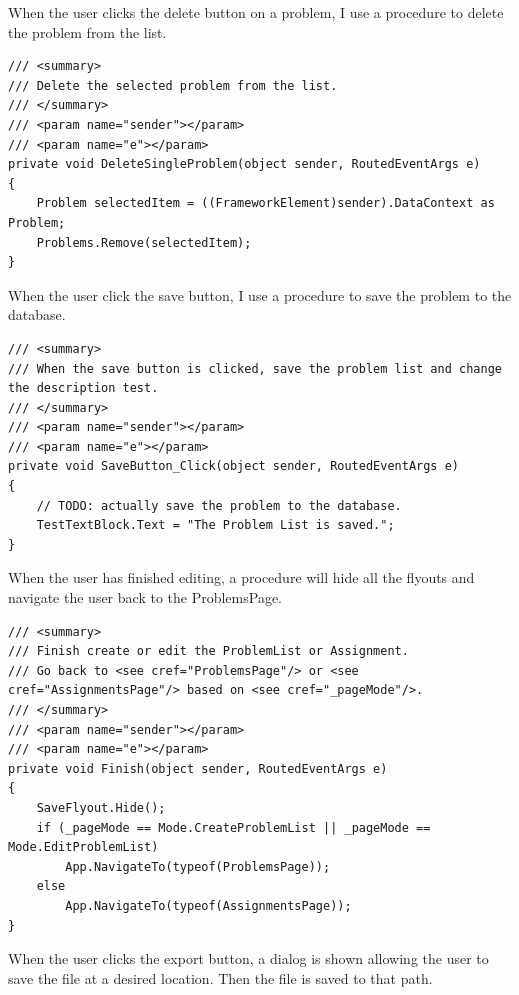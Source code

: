 \documentclass[a4paper]{report}
\begin{document}
When the user clicks the delete button on a problem, I use a procedure to delete the problem from the list.

\begin{verbatim}
/// <summary>
/// Delete the selected problem from the list.
/// </summary>
/// <param name="sender"></param>
/// <param name="e"></param>
private void DeleteSingleProblem(object sender, RoutedEventArgs e)
{
    Problem selectedItem = ((FrameworkElement)sender).DataContext as Problem;
    Problems.Remove(selectedItem);
}
\end{verbatim}

When the user click the save button, I use a procedure to save the problem to the database.

\begin{verbatim}
/// <summary>
/// When the save button is clicked, save the problem list and change the description test.
/// </summary>
/// <param name="sender"></param>
/// <param name="e"></param>
private void SaveButton_Click(object sender, RoutedEventArgs e)
{
    // TODO: actually save the problem to the database.
    TestTextBlock.Text = "The Problem List is saved.";
}
\end{verbatim}

When the user has finished editing, a procedure will hide all the flyouts and navigate the user back to the ProblemsPage.

\begin{verbatim}
/// <summary>
/// Finish create or edit the ProblemList or Assignment.
/// Go back to <see cref="ProblemsPage"/> or <see cref="AssignmentsPage"/> based on <see cref="_pageMode"/>.
/// </summary>
/// <param name="sender"></param>
/// <param name="e"></param>
private void Finish(object sender, RoutedEventArgs e)
{
    SaveFlyout.Hide();
    if (_pageMode == Mode.CreateProblemList || _pageMode == Mode.EditProblemList)
        App.NavigateTo(typeof(ProblemsPage));
    else
        App.NavigateTo(typeof(AssignmentsPage));
}
\end{verbatim}

When the user clicks the export button, a dialog is shown allowing the user to save the file at a desired location\cite{microsoft:docs:quickstart-using-file-and-folder-pickers}. Then the file is saved to that path.
\end{document}
